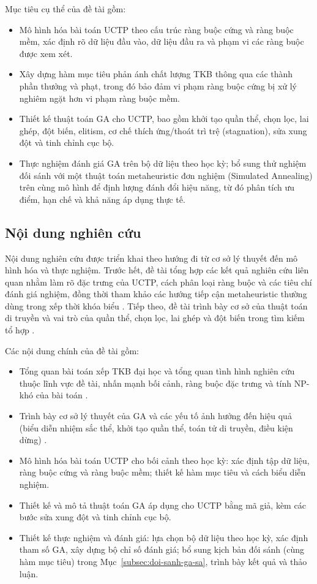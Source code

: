 \documentclass[a4paper,12pt,oneside]{article}
\begin{document}
	Mục tiêu cụ thể của đề tài gồm:
	\begin{itemize}
		\item Mô hình hóa bài toán UCTP theo cấu trúc ràng buộc cứng và ràng buộc mềm, xác định rõ dữ liệu đầu vào, dữ liệu đầu ra và phạm vi các ràng buộc được xem xét.
		\item Xây dựng hàm mục tiêu phản ánh chất lượng TKB thông qua các thành phần thưởng và phạt, trong đó bảo đảm vi phạm ràng buộc cứng bị xử lý nghiêm ngặt hơn vi phạm ràng buộc mềm.
		\item Thiết kế thuật toán GA cho UCTP, bao gồm khởi tạo quần thể, chọn lọc, lai ghép, đột biến, elitism, cơ chế thích ứng/thoát trì trệ (stagnation), sửa xung đột và tinh chỉnh cục bộ.
		\item Thực nghiệm đánh giá GA trên bộ dữ liệu theo học kỳ; bổ sung thử nghiệm đối sánh với một thuật toán metaheuristic đơn nghiệm (Simulated Annealing) trên cùng mô hình để định lượng đánh đổi hiệu năng, từ đó phân tích ưu điểm, hạn chế và khả năng áp dụng thực tế.
	\end{itemize}
	
	\subsection*{Nội dung nghiên cứu}
	
	Nội dung nghiên cứu được triển khai theo hướng đi từ cơ sở lý thuyết đến mô hình hóa và thực nghiệm. Trước hết, đề tài tổng hợp các kết quả nghiên cứu liên quan nhằm làm rõ đặc trưng của UCTP, cách phân loại ràng buộc và các tiêu chí đánh giá nghiệm, đồng thời tham khảo các hướng tiếp cận metaheuristic thường dùng trong xếp thời khóa biểu \cite{schaerf1999survey,lewis2008survey}. Tiếp theo, đề tài trình bày cơ sở của thuật toán di truyền và vai trò của quần thể, chọn lọc, lai ghép và đột biến trong tìm kiếm tổ hợp \cite{holland1975adaptation,goldberg1989genetic,eiben2015introduction,burke1997automated,lewis2008survey}.
	
	Các nội dung chính của đề tài gồm:
	\begin{itemize}
		\item Tổng quan bài toán xếp TKB đại học và tổng quan tình hình nghiên cứu thuộc lĩnh vực đề tài, nhấn mạnh bối cảnh, ràng buộc đặc trưng và tính NP-khó của bài toán \cite{schaerf1999survey,lewis2008survey}.
		\item Trình bày cơ sở lý thuyết của GA và các yếu tố ảnh hưởng đến hiệu quả (biểu diễn nhiệm sắc thể, khởi tạo quần thể, toán tử di truyền, điều kiện dừng) \cite{burke1997automated,lewis2008survey}.
		\item Mô hình hóa bài toán UCTP cho bối cảnh theo học kỳ: xác định tập dữ liệu, ràng buộc cứng và ràng buộc mềm; thiết kế hàm mục tiêu và cách biểu diễn nghiệm.
		\item Thiết kế và mô tả thuật toán GA áp dụng cho UCTP bằng mã giả, kèm các bước sửa xung đột và tinh chỉnh cục bộ.
		\item Thiết kế thực nghiệm và đánh giá: lựa chọn bộ dữ liệu theo học kỳ, xác định tham số GA, xây dựng bộ chỉ số đánh giá; bổ sung kịch bản đối sánh (cùng hàm mục tiêu) trong Mục~\ref{subsec:doi-sanh-ga-sa}, trình bày kết quả và thảo luận.
	\end{itemize}
	
\end{document}
